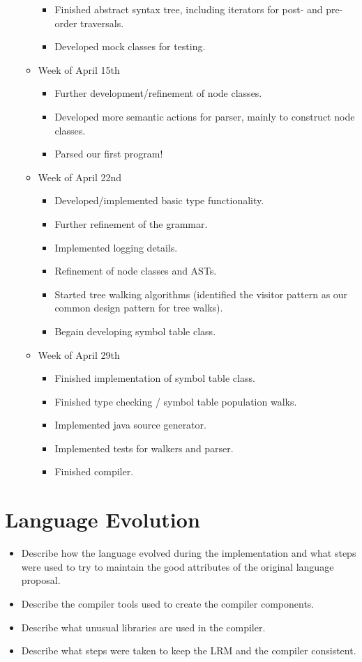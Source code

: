 \documentclass{book}
\begin{document}
\begin{itemize}
\begin{itemize}
\begin{itemize}
\item Finished abstract syntax tree, including iterators for post- and pre-order 
traversals.
\item Developed mock classes for testing.
\end{itemize}
\item[] Week of April 15th
\begin{itemize}
\item Further development/refinement of node classes.
\item Developed more semantic actions for parser, mainly to construct node classes.
\item Parsed our first program! 
\end{itemize}
\item[] Week of April 22nd
\begin{itemize}
\item Developed/implemented basic type functionality.
\item Further refinement of the grammar.
\item Implemented logging details. 
\item Refinement of node classes and ASTs.
\item Started tree walking algorithms (identified the visitor pattern as our
common design pattern for tree walks).
\item Begain developing symbol table class.
\end{itemize}
\item[] Week of April 29th
\begin{itemize}
\item Finished implementation of symbol table class.
\item Finished type checking / symbol table population walks.
\item Implemented java source generator.
\item Implemented tests for walkers and parser. 
\item Finished compiler.
\end{itemize}
\end{itemize} %
\end{itemize} %


\chapter{Language Evolution}
\label{chap:evo}

\begin{itemize}
\item Describe how the language evolved during the implementation and what steps were used to try to maintain the good attributes of the original language proposal.
\item Describe the compiler tools used to create the compiler components.
\item Describe what unusual libraries are used in the compiler.
\item Describe what steps were taken to keep the LRM and the compiler consistent.
\end{itemize}
\end{document}
